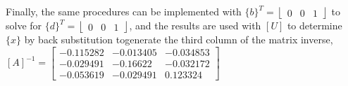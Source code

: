\documentclass[../main.tex]{subfiles}
\begin{document}
\bigbreak
Finally, the same procedures can be implemented with $\{b\}^{T}=\left\lfloor\begin{array}{lll}0 & 0 & 1\end{array}\right\rfloor$ to solve for $\{d\}^{T}=$\smallbreak $\left\lfloor\begin{array}{lll}0 & 0 & 1\end{array}\right\rfloor$, and the results are used with $[U]$ to determine $\{x\}$ by back substitution to\smallbreak generate the third column of the matrix inverse,
\bigbreak
$[A]^{-1}=\left[\begin{array}{ccc}
-0.115282 & -0.013405 & -0.034853 \\
-0.029491 & -0.16622 & -0.032172 \\
-0.053619 & -0.029491 & 0.123324
\end{array}\right]$
\bigbreak
\end{document}
